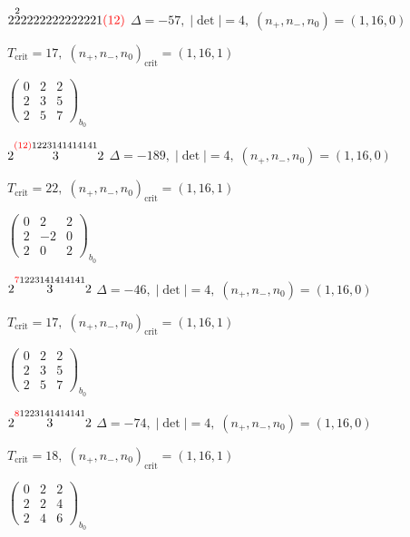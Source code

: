 \documentclass[10pt]{article}
\begin{document}
\smallskip

$2\overset{2}{2}2222222222221\textcolor{red}{(12)}$ \quad $\Delta=-57,\; |\det|=4,\; (n_+,n_-,n_0)=(1,16,0)$

\hspace{1em}$T_{\text{crit}}=17,\; (n_+,n_-,n_0)_{\text{crit}}=(1,16,1)$

\hspace{2em}$\left(\begin{smallmatrix}0 & 2 & 2 \\ 2 & 3 & 5 \\ 2 & 5 & 7\end{smallmatrix}\right)_{\!b_0}$

\smallskip

$2\overset{\textcolor{red}{(12)}1223141414141}{3}2$ \quad $\Delta=-189,\; |\det|=4,\; (n_+,n_-,n_0)=(1,16,0)$

\hspace{1em}$T_{\text{crit}}=22,\; (n_+,n_-,n_0)_{\text{crit}}=(1,16,1)$

\hspace{2em}$\left(\begin{smallmatrix}0 & 2 & 2 \\ 2 & -2 & 0 \\ 2 & 0 & 2\end{smallmatrix}\right)_{\!b_0}$

$2\overset{\textcolor{red}{7}1223141414141}{3}2$ \quad $\Delta=-46,\; |\det|=4,\; (n_+,n_-,n_0)=(1,16,0)$

\hspace{1em}$T_{\text{crit}}=17,\; (n_+,n_-,n_0)_{\text{crit}}=(1,16,1)$

\hspace{2em}$\left(\begin{smallmatrix}0 & 2 & 2 \\ 2 & 3 & 5 \\ 2 & 5 & 7\end{smallmatrix}\right)_{\!b_0}$

$2\overset{\textcolor{red}{8}1223141414141}{3}2$ \quad $\Delta=-74,\; |\det|=4,\; (n_+,n_-,n_0)=(1,16,0)$

\hspace{1em}$T_{\text{crit}}=18,\; (n_+,n_-,n_0)_{\text{crit}}=(1,16,1)$

\hspace{2em}$\left(\begin{smallmatrix}0 & 2 & 2 \\ 2 & 2 & 4 \\ 2 & 4 & 6\end{smallmatrix}\right)_{\!b_0}$
\end{document}
